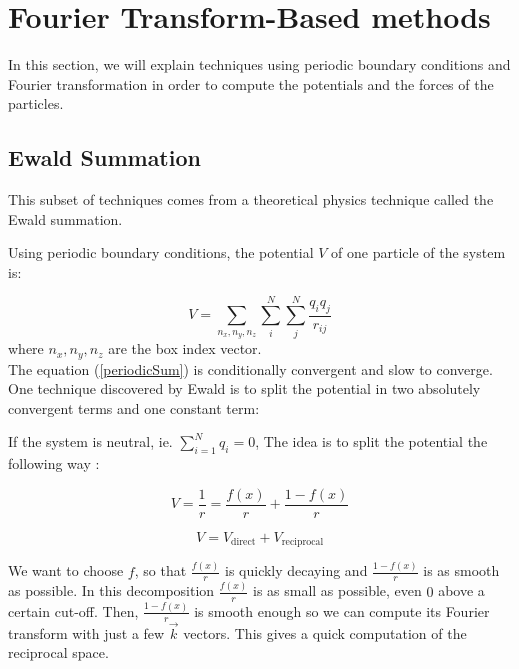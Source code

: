 \documentclass[11pt,twoside,a4paper]{report}
\begin{document}


\section{Fourier Transform-Based methods}

In this section, we will explain techniques using periodic boundary conditions and Fourier transformation in order to compute the potentials and the forces of the particles.

\subsection{Ewald Summation}

This subset of techniques comes from a theoretical physics technique called the Ewald summation.

Using periodic boundary conditions, the potential $V$ of one particle of the system is:

\begin{equation}
	V = \sum_{n_x,n_y,n_z} \sum_{i}^{N} \sum_{j}^{N} \frac{q_i q_j}{r_{ij}}
	\label{periodicSum}
\end{equation}
where $n_x,n_y,n_z$ are the box index vector.\\

The equation (\ref{periodicSum}) is conditionally convergent and slow to converge. One technique discovered by Ewald is to split the potential in two absolutely convergent terms and one constant term:


If the system is neutral, ie. $\sum_{i=1}^N q_i = 0$, The idea is to split the potential the following way :

\begin{equation}
    V = \frac{1}{r} = \frac{f(x)}{r} + \frac{1 - f(x)}{r}
\end{equation}


\begin{equation}
    V = V_{\text{direct}} + V_{\text{reciprocal}}
\end{equation}

We want to choose $f$, so that $\frac{f(x)}{r}$ is quickly decaying and $\frac{1 - f(x)}{r}$ is as smooth as possible. In this decomposition $\frac{f(x)}{r}$  is as small as possible, even $0$ above a certain cut-off. Then, $\frac{1-f(x)}{r}$ is smooth enough so we can compute its Fourier transform with just a few $\overrightarrow{k}$ vectors. This gives a quick computation of the reciprocal space.
\end{document}
